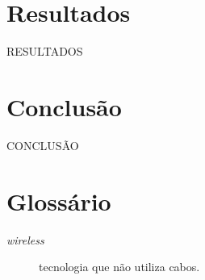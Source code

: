\documentclass[tc,twoside]{iiufrgs}
\begin{document}
	
\chapter{Resultados} 

RESULTADOS

\chapter{Conclusão} 

CONCLUSÃO

 

\chapter*{Glossário} 

\begin{description} 
	\item[\textit{wireless}] tecnologia que não utiliza cabos.
\end{description} 


\end{document}
